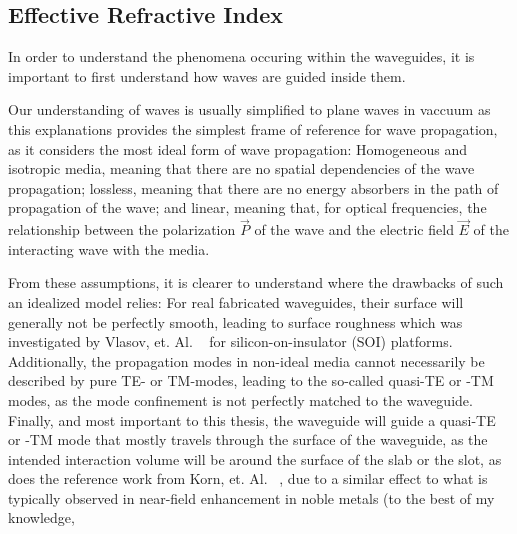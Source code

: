 \subsection{Effective Refractive Index}

In order to understand the phenomena occuring within the waveguides, it is important to first understand how waves are guided inside them.\par\medskip

Our understanding of waves is usually simplified to plane waves in vaccuum as this explanations provides the simplest frame of reference for wave propagation, as it considers the most ideal form of wave propagation: Homogeneous and isotropic media, meaning that there are no spatial dependencies of the wave propagation; lossless, meaning that there are no energy absorbers in the path of propagation of the wave; and linear, meaning that, for optical frequencies, the relationship between the polarization $\vec P$ of the wave and the electric field $\vec E$ of the interacting wave with the media.\par\medskip

From these assumptions, it is clearer to understand where the drawbacks of such an idealized model relies: For real fabricated waveguides, their surface will generally not be perfectly smooth, leading to surface roughness which was investigated by Vlasov, et. Al. ~\cite{Vlasov:04} for silicon-on-insulator (SOI) platforms. Additionally, the propagation modes in non-ideal media cannot necessarily be described by pure TE- or TM-modes, leading to the so-called quasi-TE or -TM modes, as the mode confinement is not perfectly matched to the waveguide. Finally, and most important to this thesis, the waveguide will guide a quasi-TE or -TM mode that mostly travels through the surface of the waveguide, as the intended interaction volume will be around the surface of the slab or the slot, as does the reference work from Korn, et. Al. ~\cite{Korn:16}, due to a similar effect to what is typically observed in near-field enhancement in noble metals (to the best of my knowledge, 

